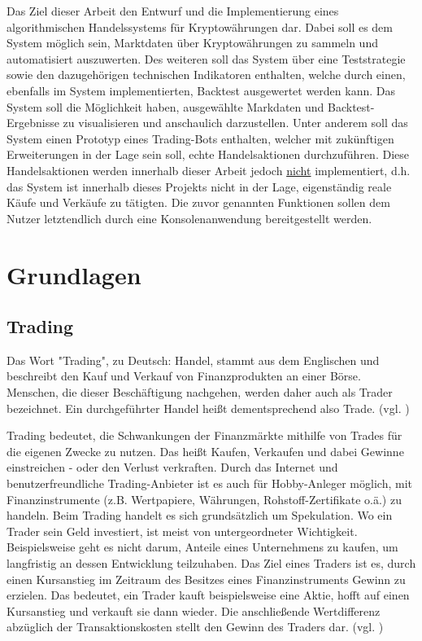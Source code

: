 \documentclass[oneside]{ausarbeitung}
\begin{document}
Das Ziel dieser Arbeit den Entwurf und die Implementierung
eines algorithmischen Handelssystems für Kryptowährungen dar. Dabei
soll es dem System möglich sein, Marktdaten über Kryptowährungen zu
sammeln und automatisiert auszuwerten. Des weiteren soll das System
über eine Teststrategie sowie den dazugehörigen technischen
Indikatoren enthalten, welche durch einen, ebenfalls im System
implementierten, Backtest ausgewertet werden kann. Das System soll die
Möglichkeit haben, ausgewählte Markdaten und Backtest-Ergebnisse
zu visualisieren und anschaulich darzustellen. Unter anderem soll das
System einen Prototyp eines Trading-Bots enthalten, welcher mit
zukünftigen Erweiterungen in der Lage sein soll, echte
Handelsaktionen durchzuführen. Diese Handelsaktionen werden innerhalb
dieser Arbeit jedoch \underline{nicht} implementiert, d.h. das System
ist innerhalb dieses Projekts nicht in der Lage, eigenständig reale
Käufe und Verkäufe zu tätigten. Die zuvor genannten Funktionen
sollen dem Nutzer letztendlich durch eine Konsolenanwendung
bereitgestellt werden.

\chapter{Grundlagen}
\label{cha:grundlagen}

\section{Trading}
\label{sec:trading}

Das Wort "Trading", zu Deutsch: Handel, stammt aus dem Englischen und
beschreibt den Kauf und Verkauf von Finanzprodukten an einer Börse.
Menschen, die dieser Beschäftigung nachgehen, werden daher auch als
Trader bezeichnet. Ein durchgeführter Handel heißt dementsprechend
also Trade. (vgl. \cite{trading_1})

Trading bedeutet, die Schwankungen der Finanzmärkte mithilfe von
Trades für die eigenen Zwecke zu nutzen. Das heißt Kaufen, Verkaufen
und dabei Gewinne einstreichen - oder den Verlust verkraften. Durch
das Internet und benutzerfreundliche Trading-Anbieter ist es auch für
Hobby-Anleger möglich, mit Finanzinstrumente (z.B. Wertpapiere, Währungen,
Rohstoff-Zertifikate o.ä.) zu handeln. Beim Trading handelt
es sich grundsätzlich um Spekulation. Wo ein Trader sein Geld
investiert, ist meist von untergeordneter Wichtigkeit. Beispielsweise
geht es nicht darum, Anteile eines Unternehmens zu kaufen, um
langfristig an dessen Entwicklung teilzuhaben. Das Ziel eines Traders
ist es, durch einen Kursanstieg im Zeitraum des Besitzes eines
Finanzinstruments Gewinn zu erzielen. Das bedeutet, ein Trader kauft
beispielsweise eine Aktie, hofft auf einen Kursanstieg und verkauft
sie dann wieder. Die anschließende Wertdifferenz abzüglich der
Transaktionskosten stellt den Gewinn des Traders dar. (vgl.
\cite{trading_2})
\end{document}
